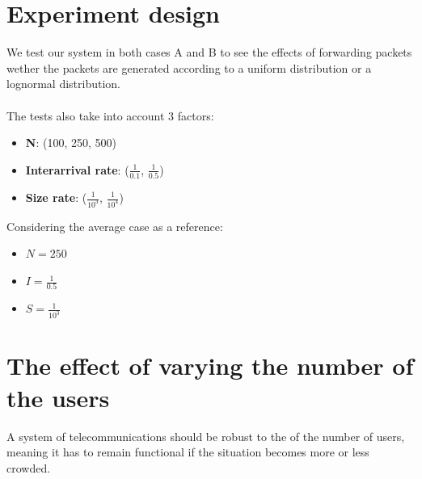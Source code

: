 \documentclass{report}
\begin{document}
\section{Experiment design}
We test our system in both cases A and B to see the effects of forwarding packets wether the packets are generated according to a uniform distribution or a lognormal distribution.\\\\
The tests also take into account 3 factors:
\begin{itemize}
    \item \textbf{N}: (100, 250, 500)
    \item \textbf{Interarrival rate}: ($\frac{1}{0.1}$, $\frac{1}{0.5}$)
    \item \textbf{Size rate}: ($\frac{1}{10^3}$, $\frac{1}{10^4}$)
\end{itemize}

Considering the average case as a reference:
\begin{itemize}
    \item $N=250$
    \item $I=\frac{1}{0.5}$
    \item $S=\frac{1}{10^3}$
\end{itemize}

\section{The effect of varying the number of the users}
A system of telecommunications should be robust to the of the number of users, meaning it has to remain functional if the situation becomes more or less crowded.
\end{document}
